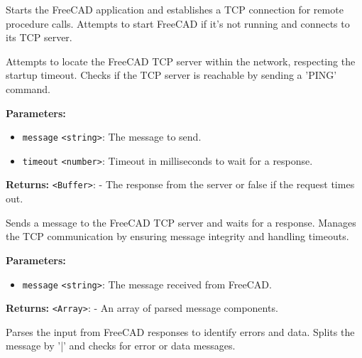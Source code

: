 \documentclass[12pt,a4paper]{article}
\begin{document}
\noindent Starts the FreeCAD application and establishes a TCP connection for remote procedure calls.
Attempts to start FreeCAD if it's not running and connects to its TCP server.

\vspace{5mm}
\noindent {}


\noindent Attempts to locate the FreeCAD TCP server within the network, respecting the startup timeout.
Checks if the TCP server is reachable by sending a 'PING' command.

\vspace{5mm}
\noindent {}


\noindent \textbf{Parameters:}
\begin{itemize}
  \item \texttt{message} \texttt{<string>}: The message to send.
  \item \texttt{timeout} \texttt{<number>}: Timeout in milliseconds to wait for a response.
\end{itemize}

\noindent \textbf{Returns:} \texttt{<Buffer>}: - The response from the server or false if the request times out.

\noindent Sends a message to the FreeCAD TCP server and waits for a response.
Manages the TCP communication by ensuring message integrity and handling timeouts.

\vspace{5mm}
\noindent {}


\noindent \textbf{Parameters:}
\begin{itemize}
  \item \texttt{message} \texttt{<string>}: The message received from FreeCAD.
\end{itemize}

\noindent \textbf{Returns:} \texttt{<Array>}: - An array of parsed message components.

\noindent Parses the input from FreeCAD responses to identify errors and data.
Splits the message by '|' and checks for error or data messages.
\end{document}
